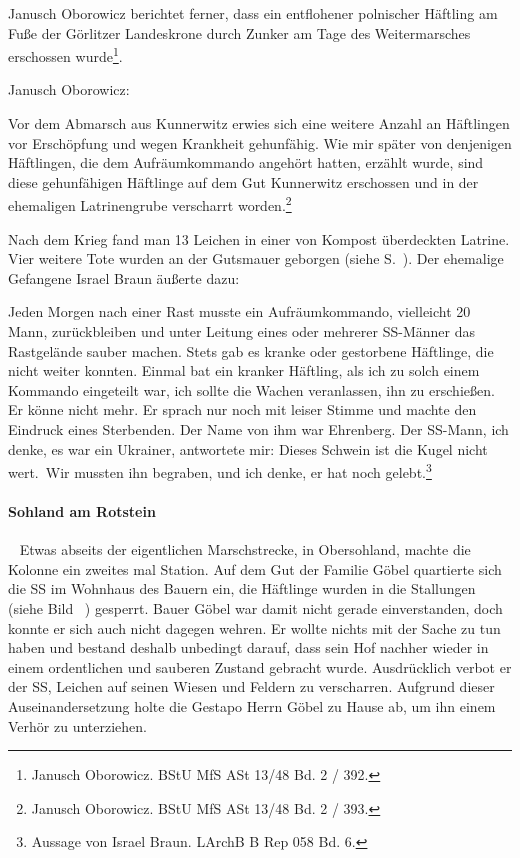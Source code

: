 Janusch Oborowicz berichtet ferner, dass ein entflohener polnischer Häftling am Fuße der Görlitzer Landeskrone durch Zunker am Tage des Weitermarsches erschossen wurde\footnote{Janusch Oborowicz. BStU MfS ASt 13/48 Bd. 2 / 392.}.

Janusch Oborowicz:
\begin{leftbar}   
Vor dem Abmarsch aus Kunnerwitz erwies sich eine weitere Anzahl an Häftlingen vor Erschöpfung und wegen Krankheit gehunfähig. Wie mir später von denjenigen Häftlingen, die dem Aufräumkommando angehört hatten, erzählt wurde, sind diese gehunfähigen Häftlinge auf dem Gut Kunnerwitz erschossen und in der ehemaligen Latrinengrube verscharrt worden.\footnote{Janusch Oborowicz. BStU MfS ASt 13/48 Bd. 2 / 393.}
\end{leftbar}

Nach dem Krieg fand man 13 Leichen in einer von Kompost überdeckten Latrine. Vier weitere Tote wurden an der Gutsmauer geborgen (siehe S.~\pageref{kunnerwitz}).
Der ehemalige Gefangene Israel Braun äußerte dazu:
\begin{leftbar}   
Jeden Morgen nach einer Rast musste ein Aufräumkommando, vielleicht 20 Mann, zurückbleiben und unter Leitung eines oder mehrerer SS-Männer das Rastgelände sauber machen. Stets gab es kranke oder gestorbene Häftlinge, die nicht weiter konnten. Einmal bat ein kranker Häftling, als ich zu solch einem Kommando eingeteilt war, ich sollte die Wachen veranlassen, ihn zu erschießen. Er könne nicht mehr. Er sprach nur noch mit leiser Stimme und machte den Eindruck eines Sterbenden. Der Name von ihm war Ehrenberg. Der SS-Mann, ich denke, es war ein Ukrainer, antwortete mir: \glqq Dieses Schwein ist die Kugel nicht wert.\grqq~Wir mussten ihn begraben, und ich denke, er hat noch gelebt.\footnote{Aussage von Israel Braun. LArchB B Rep 058 Bd. 6.}
\end{leftbar}


\paragraph{Sohland am Rotstein}
~\newline
Etwas abseits der eigentlichen Marschstrecke, in Obersohland, machte die Kolonne ein zweites mal Station. Auf dem Gut der Familie Göbel quartierte sich die SS im Wohnhaus des Bauern ein, die Häftlinge wurden in die Stallungen (siehe Bild ~) gesperrt. Bauer Göbel war damit nicht gerade einverstanden, doch konnte er sich auch nicht dagegen wehren. Er wollte nichts mit der Sache zu tun haben und bestand deshalb unbedingt darauf, dass sein Hof nachher wieder in einem ordentlichen und sauberen Zustand gebracht wurde. Ausdrücklich verbot er der SS, Leichen auf seinen Wiesen und Feldern zu verscharren. Aufgrund dieser Auseinandersetzung holte die Gestapo Herrn Göbel zu Hause ab, um ihn einem Verhör zu unterziehen. 

